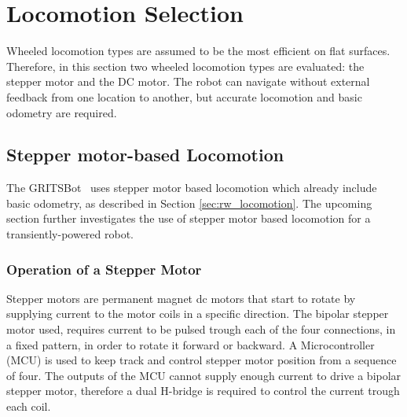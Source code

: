 \section{Locomotion Selection}
\label{sec:pre_locomotion_selection}

Wheeled locomotion types are assumed to be the most efficient on flat surfaces.
Therefore, in this section two wheeled locomotion types are evaluated: the stepper motor and the DC motor.
The robot can navigate without external feedback from one location to another, but accurate locomotion and basic odometry are required.

\subsection{Stepper motor-based Locomotion}

The GRITSBot~\cite{pickem_icra_2015} uses stepper motor based locomotion which already include basic odometry, as described in Section \ref{sec:rw_locomotion}.
The upcoming section further investigates the use of stepper motor based locomotion for a transiently-powered robot.

\subsubsection{Operation of a Stepper Motor}
Stepper motors are permanent magnet dc motors that start to rotate by supplying current to the motor coils in a specific direction.
The bipolar stepper motor used, requires current to be pulsed trough each of the four connections, in a fixed pattern, in order to rotate it forward or backward.
A Microcontroller (MCU) is used to keep track and control stepper motor position from a sequence of four.
The outputs of the MCU cannot supply enough current to drive a bipolar stepper motor, therefore a dual H-bridge is required to control the current trough each coil.


